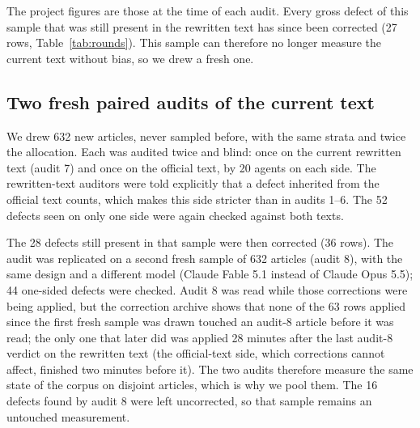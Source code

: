 \documentclass[11pt,a4paper]{article}
\begin{document}
The project figures are those at the time of each audit. Every gross defect of this sample that was still present in the rewritten text has since been corrected (27 rows, Table~\ref{tab:rounds}). This sample can therefore no longer measure the current text without bias, so we drew a fresh one.

\subsection{Two fresh paired audits of the current text}
\label{sec:fresh}

We drew 632 new articles, never sampled before, with the same strata and twice the allocation. Each was audited twice and blind: once on the current rewritten text (audit 7) and once on the official text, by 20 agents on each side. The rewritten-text auditors were told explicitly that a defect inherited from the official text counts, which makes this side stricter than in audits 1--6. The 52 defects seen on only one side were again checked against both texts.

The 28 defects still present in that sample were then corrected (36 rows). The audit was replicated on a second fresh sample of 632 articles (audit 8), with the same design and a different model (Claude Fable 5.1 instead of Claude Opus 5.5); 44 one-sided defects were checked. Audit 8 was read while those corrections were being applied, but the correction archive shows that none of the 63 rows applied since the first fresh sample was drawn touched an audit-8 article before it was read; the only one that later did was applied 28 minutes after the last audit-8 verdict on the rewritten text (the official-text side, which corrections cannot affect, finished two minutes before it). The two audits therefore measure the same state of the corpus on disjoint articles, which is why we pool them. The 16 defects found by audit 8 were left uncorrected, so that sample remains an untouched measurement.
\end{document}
